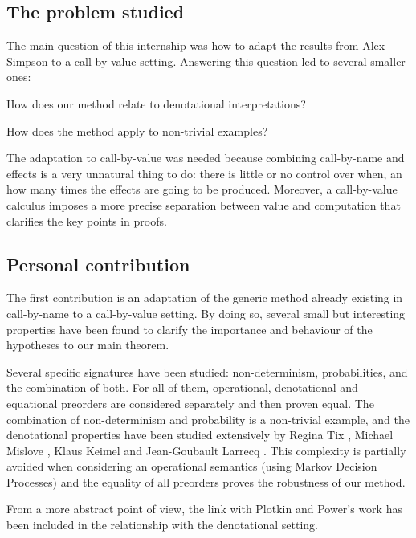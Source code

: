 \documentclass{article}
\newenvironment{point}[1]%
{\subsection*{#1}}%
{}
\begin{document}
\begin{point}{The problem studied}

    The main question of this internship was
    how to adapt the results from Alex Simpson \cite{gom} 
    to a call-by-value setting. 
    Answering this question led to several smaller ones:
    \begin{inparaenum}[(a)]
        \item How does our method relate to denotational interpretations? 
        \item How does the method apply  to non-trivial examples?
    \end{inparaenum}

    The adaptation to call-by-value was needed because 
    combining call-by-name and effects is a very 
    unnatural thing to do: there is little or 
    no control over when, an how many times 
    the effects are going to be produced. Moreover,
    a call-by-value calculus imposes a more precise 
    separation between value and computation that 
    clarifies the key points in proofs. 

\end{point}

\begin{point}{Personal contribution}

    The first contribution is an adaptation of 
    the generic method already existing in call-by-name 
    \cite{gom} to a call-by-value setting. By doing 
    so, several small but interesting properties have 
    been found to clarify the importance and 
    behaviour of the hypotheses to our main theorem.

    Several specific signatures have been studied: non-determinism,
    probabilities, and the combination of both. For all of them, 
    operational, denotational and equational preorders 
    are considered separately and then proven equal. 
    The combination of non-determinism and probability is 
    a non-trivial example, and the denotational properties 
    have been studied extensively by Regina Tix \cite{tix2009semantic},
    Michael Mislove \cite{mislove2004axioms}, Klaus Keimel  \cite{KeimelP2016}
    and Jean-Goubault Larrecq \cite{JGL-mscs16}. This complexity 
    is partially avoided when considering an operational semantics 
    (using Markov Decision Processes) and the equality of all preorders proves the robustness of 
    our method.

    From a more abstract point of view, the link 
    with Plotkin and Power's work \cite{plotkin2001adequacy} 
    has been included in the relationship with the denotational setting.
\end{point}
\end{document}
